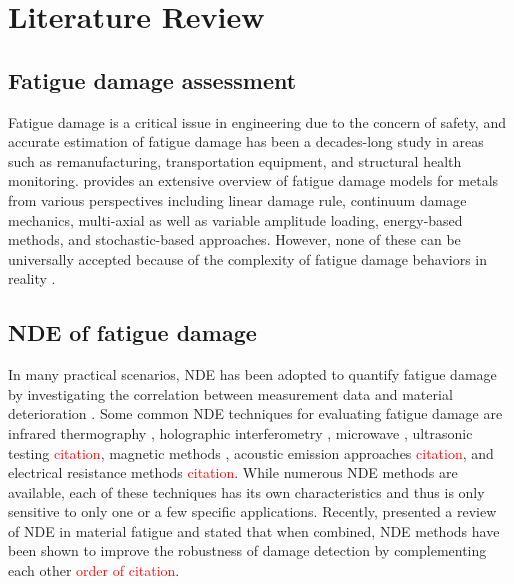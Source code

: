 \chapter{Literature Review}
\label{chap: litrev}

\section{Fatigue damage assessment}
Fatigue damage is a critical issue in engineering due to the concern of safety, and accurate estimation of fatigue damage has been a decades-long study in areas such as remanufacturing, transportation equipment, and structural health monitoring.  provides an extensive overview of fatigue damage models for metals from various perspectives including linear damage rule, continuum damage mechanics, multi-axial as well as variable amplitude loading, energy-based methods, and stochastic-based approaches. However, none of these can be universally accepted because of the complexity of fatigue damage behaviors in reality \cite{fatigue-review-Santecchia2016}.

\section{NDE of fatigue damage}
In many practical scenarios, NDE has been adopted to quantify fatigue damage by investigating the correlation between measurement data and material deterioration \cite{nde-review-ACHENBACH200013}. Some common NDE techniques for evaluating fatigue damage are infrared thermography \cite{nde-thermo-FAN20121}, holographic interferometry \cite{nde-dic}, microwave \cite{nde-microwave}, ultrasonic testing \textcolor{red}{citation}, magnetic methods \cite{nde-magnetic}, acoustic emission approaches \textcolor{red}{citation}, and electrical resistance methods \textcolor{red}{citation}. While numerous NDE methods are available, each of these techniques has its own characteristics and thus is only sensitive to only one or a few specific applications. Recently,  presented a review of NDE in material fatigue and stated that when combined, NDE methods have been shown to improve the robustness of damage detection by complementing each other \cite{nde-review-WISNER2020} \textcolor{red}{order of citation}.

